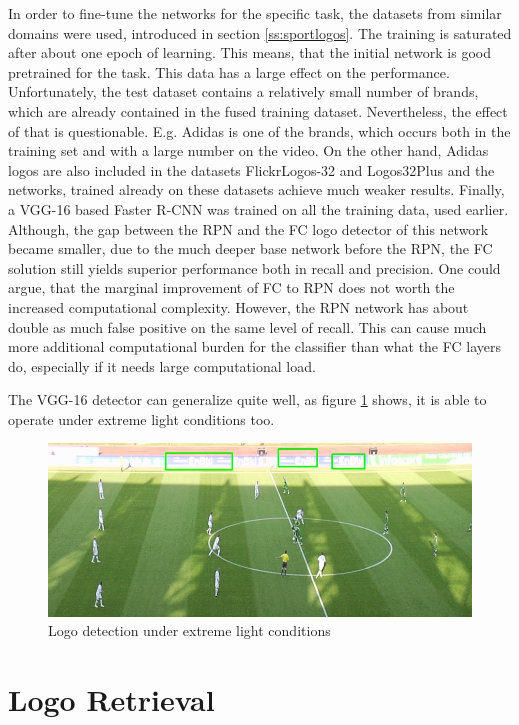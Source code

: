 In order to fine-tune the networks for the specific task, the datasets from similar domains were used, introduced in section \ref{ss:sportlogos}. The training is saturated after about one epoch of learning. This means, that the initial network is good pretrained for the task. This data has a large effect on the performance.
\bigbreak
Unfortunately, the test dataset contains a relatively small number of brands, which are already contained in the fused training dataset. Nevertheless, the effect of that is questionable. E.g. Adidas is one of the brands, which occurs both in the training set and with a large number on the video. On the other hand, Adidas logos are also included in the datasets FlickrLogos-32 and Logos32Plus and the networks, trained already on these datasets achieve much weaker results.
\bigbreak
Finally, a VGG-16 based Faster R-CNN was trained on all the training data, used earlier. Although, the gap between the RPN and the FC logo detector of this network became smaller, due to the much deeper base network before the RPN, the FC solution still yields superior performance both in recall and precision. One could argue, that the marginal improvement of FC to RPN does not worth the increased computational complexity. However, the RPN network has about double as much false positive on the same level of recall. This can cause much more additional computational burden for the classifier than what the FC layers do, especially if it needs large computational load.

The VGG-16 detector can generalize quite well, as figure \ref{f:extreme} shows, it is able to operate under extreme light conditions too.

\begin{figure}
  \centering
  \includegraphics[width=120mm]{images/mt/extreme.png}
  \caption{Logo detection under extreme light conditions}
  \label{f:extreme}
\end{figure}

\section{Logo Retrieval}\label{s:logoretrieval}

